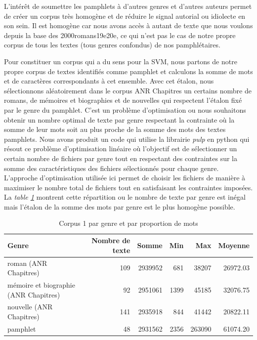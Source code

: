 L'intérêt de soumettre les pamphlets à d'autres genres et d'autres auteurs permet de créer un corpus très homogène et de réduire le signal autorial ou idiolecte en son sein. Il est homogène car nous avons accès à autant de texte que nous voulons depuis la base des 2000romans19e20e, ce qui n'est pas le cas de notre propre corpus de tous les textes (tous genres confondus) de nos pamphlétaires.

Pour constituer un corpus qui a du sens pour la SVM, nous partons de notre propre corpus de textes identifiés comme pamphlet et calculons la somme de mots et de caractères correspondants à cet ensemble. Avec cet étalon, nous sélectionnons aléatoirement dans le corpus ANR Chapitres un certains nombre de romans, de mémoires et biographies et de nouvelles qui respectent l'étalon fixé par le genre du pamphlet. C'est un problème d'optimisation ou nous souhaitons obtenir un nombre optimal de texte par genre respectant la contrainte où la somme de leur mots soit au plus proche de la somme des mots des textes pamphlets. Nous avons produit un code qui utilise la librairie \textit{pulp} en python qui résout ce problème d'optimisation linéaire où l'objectif est de sélectionner un certain nombre de fichiers par genre tout en respectant des contraintes sur la somme des caractéristiques des fichiers sélectionnés pour chaque genre. L'approche d'optimisation utilisée ici permet de choisir les fichiers de manière à maximiser le nombre total de fichiers tout en satisfaisant les contraintes imposées. La \textit{table \ref{'tab:corpus-mix-word'}} montrent cette répartition ou le nombre de texte par genre est inégal mais l'étalon de la somme des mots par genre est le plus homogène possible.
\begin{table}[H]
    \centering
    \begin{tabular}{lrrrrr}
    \toprule
    Genre & Nombre de texte & Somme & Min & Max & Moyenne  \\
    \toprule
    \midrule
    roman (ANR Chapitres) & 109 & 2939952 & 681 & 38207 & 26972.03 \\
    \midrule
    mémoire et biographie (ANR Chapitres) & 92 & 2951061 & 1399 & 45185 & 32076.75 \\
    \midrule
    nouvelle (ANR Chapitres) & 141 & 2935918 & 844 & 41442 & 20822.11 \\
    \midrule
    pamphlet & 48 & 2931562 & 2356 & 263090 & 61074.20 \\
    \bottomrule
    \end{tabular}
    \caption{Corpus 1 par genre et par proportion de mots}
    \label{'tab:corpus-mix-word'}
\end{table}

